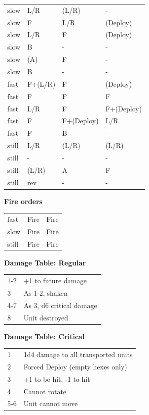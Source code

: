 \documentclass[a4paper,12pt]{article}
\begin{document}
\begin{tabular}{llll}
slow & L/R & (L/R) & - \\
slow & F & L/R & (Deploy) \\
slow & L/R & F & (Deploy) \\
slow & B & - & - \\
slow & (A) & F & - \\
slow & B & - & - \\
fast & F+(L/R) & F & (Deploy) \\
fast & F & F & F \\
fast & L/R & F & F+(Deploy) \\
fast & F & F+(Deploy) & L/R \\
fast & F & B & - \\
still & L/R & (L/R) & (L/R) \\
still & - & - & - \\
still & (L/R) & A & F \\
still & rev & - & - \\
\end{tabular}
\vspace{1ex}


\noindent\textbf{Fire orders}

\begin{tabular}{lll}
fast & Fire & Fire \\
slow & Fire & Fire \\
still & Fire & Fire \\
\end{tabular}
\vspace{1ex}


\noindent\textbf{Damage Table: Regular}

\begin{tabular}{@{}lp{}@{}}
1-2 & +1 to future damage \\
3 & As 1-2, shaken \\
4-7 & As 3, d6 critical damage \\
8 & Unit destroyed \\
\end{tabular}
\vspace{1ex}

\noindent\textbf{Damage Table: Critical}

\begin{tabular}{@{}lp{}@{}}
1 & 1d4 damage to all transported units \\
2 & Forced Deploy (empty hexes only) \\
3 & +1 to be hit, -1 to hit \\
4 & Cannot rotate \\
5-6 & Unit cannot move \\
\end{tabular}
\vspace{1ex}
\end{document}
